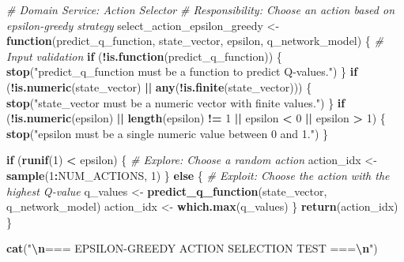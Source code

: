 \documentclass[
]{article}
\newenvironment{Shaded}{\begin{snugshade}}{\end{snugshade}}
\newcommand{\CommentTok}[1]{\textcolor[rgb]{0.56,0.35,0.01}{\textit{#1}}}
\newcommand{\ControlFlowTok}[1]{\textcolor[rgb]{0.13,0.29,0.53}{\textbf{#1}}}
\newcommand{\DecValTok}[1]{\textcolor[rgb]{0.00,0.00,0.81}{#1}}
\newcommand{\FunctionTok}[1]{\textcolor[rgb]{0.13,0.29,0.53}{\textbf{#1}}}
\newcommand{\NormalTok}[1]{#1}
\newcommand{\OtherTok}[1]{\textcolor[rgb]{0.56,0.35,0.01}{#1}}
\newcommand{\SpecialCharTok}[1]{\textcolor[rgb]{0.81,0.36,0.00}{\textbf{#1}}}
\newcommand{\StringTok}[1]{\textcolor[rgb]{0.31,0.60,0.02}{#1}}
\begin{document}
\begin{Shaded}
\begin{Highlighting}[]
\CommentTok{\# Domain Service: Action Selector}
\CommentTok{\# Responsibility: Choose an action based on epsilon{-}greedy strategy}
\NormalTok{select\_action\_epsilon\_greedy }\OtherTok{\textless{}{-}} \ControlFlowTok{function}\NormalTok{(predict\_q\_function, state\_vector, epsilon, q\_network\_model) \{}
  \CommentTok{\# Input validation}
  \ControlFlowTok{if}\NormalTok{ (}\SpecialCharTok{!}\FunctionTok{is.function}\NormalTok{(predict\_q\_function)) \{}
    \FunctionTok{stop}\NormalTok{(}\StringTok{"predict\_q\_function must be a function to predict Q{-}values."}\NormalTok{)}
\NormalTok{  \}}
  \ControlFlowTok{if}\NormalTok{ (}\SpecialCharTok{!}\FunctionTok{is.numeric}\NormalTok{(state\_vector) }\SpecialCharTok{||} \FunctionTok{any}\NormalTok{(}\SpecialCharTok{!}\FunctionTok{is.finite}\NormalTok{(state\_vector))) \{}
    \FunctionTok{stop}\NormalTok{(}\StringTok{"state\_vector must be a numeric vector with finite values."}\NormalTok{)}
\NormalTok{  \}}
  \ControlFlowTok{if}\NormalTok{ (}\SpecialCharTok{!}\FunctionTok{is.numeric}\NormalTok{(epsilon) }\SpecialCharTok{||} \FunctionTok{length}\NormalTok{(epsilon) }\SpecialCharTok{!=} \DecValTok{1} \SpecialCharTok{||}\NormalTok{ epsilon }\SpecialCharTok{\textless{}} \DecValTok{0} \SpecialCharTok{||}\NormalTok{ epsilon }\SpecialCharTok{\textgreater{}} \DecValTok{1}\NormalTok{) \{}
    \FunctionTok{stop}\NormalTok{(}\StringTok{"epsilon must be a single numeric value between 0 and 1."}\NormalTok{)}
\NormalTok{  \}}
  
  \ControlFlowTok{if}\NormalTok{ (}\FunctionTok{runif}\NormalTok{(}\DecValTok{1}\NormalTok{) }\SpecialCharTok{\textless{}}\NormalTok{ epsilon) \{}
    \CommentTok{\# Explore: Choose a random action}
\NormalTok{    action\_idx }\OtherTok{\textless{}{-}} \FunctionTok{sample}\NormalTok{(}\DecValTok{1}\SpecialCharTok{:}\NormalTok{NUM\_ACTIONS, }\DecValTok{1}\NormalTok{)}
\NormalTok{  \} }\ControlFlowTok{else}\NormalTok{ \{}
    \CommentTok{\# Exploit: Choose the action with the highest Q{-}value}
\NormalTok{    q\_values }\OtherTok{\textless{}{-}} \FunctionTok{predict\_q\_function}\NormalTok{(state\_vector, q\_network\_model)}
\NormalTok{    action\_idx }\OtherTok{\textless{}{-}} \FunctionTok{which.max}\NormalTok{(q\_values)}
\NormalTok{  \}}
  \FunctionTok{return}\NormalTok{(action\_idx)}
\NormalTok{\}}

\FunctionTok{cat}\NormalTok{(}\StringTok{"}\SpecialCharTok{\textbackslash{}n}\StringTok{=== EPSILON{-}GREEDY ACTION SELECTION TEST ===}\SpecialCharTok{\textbackslash{}n}\StringTok{"}\NormalTok{)}
\end{Highlighting}
\end{Shaded}
\end{document}
